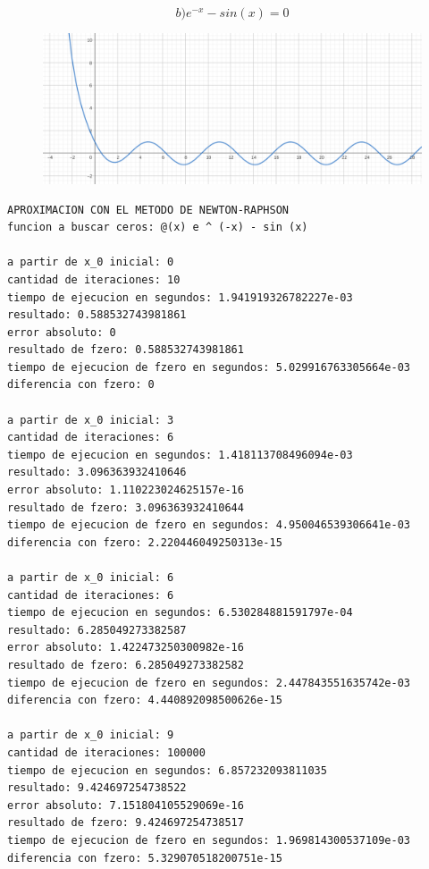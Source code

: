 \documentclass{article}
\begin{document}
\[b) e^{-x}-sin(x) = 0\]
\begin{figure}[H]
    \centering
    \includegraphics[width=0.9\linewidth]{b.png}
    \label{fig:enter-label}
    \caption{}
\end{figure}
\begin{lstlisting}
APROXIMACION CON EL METODO DE NEWTON-RAPHSON
funcion a buscar ceros: @(x) e ^ (-x) - sin (x)

a partir de x_0 inicial: 0
cantidad de iteraciones: 10
tiempo de ejecucion en segundos: 1.941919326782227e-03
resultado: 0.588532743981861
error absoluto: 0
resultado de fzero: 0.588532743981861
tiempo de ejecucion de fzero en segundos: 5.029916763305664e-03
diferencia con fzero: 0

a partir de x_0 inicial: 3
cantidad de iteraciones: 6
tiempo de ejecucion en segundos: 1.418113708496094e-03
resultado: 3.096363932410646
error absoluto: 1.110223024625157e-16
resultado de fzero: 3.096363932410644
tiempo de ejecucion de fzero en segundos: 4.950046539306641e-03
diferencia con fzero: 2.220446049250313e-15

a partir de x_0 inicial: 6
cantidad de iteraciones: 6
tiempo de ejecucion en segundos: 6.530284881591797e-04
resultado: 6.285049273382587
error absoluto: 1.422473250300982e-16
resultado de fzero: 6.285049273382582
tiempo de ejecucion de fzero en segundos: 2.447843551635742e-03
diferencia con fzero: 4.440892098500626e-15

a partir de x_0 inicial: 9
cantidad de iteraciones: 100000
tiempo de ejecucion en segundos: 6.857232093811035
resultado: 9.424697254738522
error absoluto: 7.151804105529069e-16
resultado de fzero: 9.424697254738517
tiempo de ejecucion de fzero en segundos: 1.969814300537109e-03
diferencia con fzero: 5.329070518200751e-15
\end{lstlisting}
\end{document}
